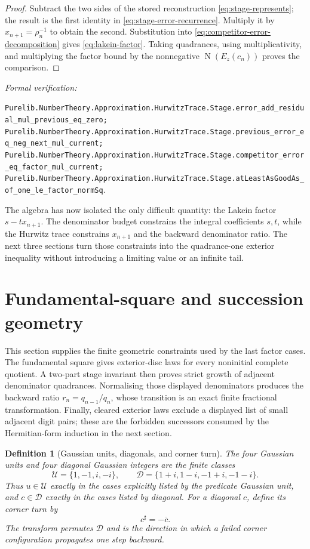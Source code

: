 \documentclass[11pt]{article}
\newtheorem{definition}[definition]{Definition}
\newcommand{\Norm}[1]{\operatorname{N}\!\left(#1\right)}
\newcommand{\leanref}[1]{\par\smallskip\noindent
  \emph{Formal verification:}\par\nobreak
  {\raggedright\nolinkurl{#1}.\par}}
\begin{document}
\begin{proof}
Subtract the two sides of the stored reconstruction
\eqref{eq:stage-represents}; the result is the first identity in
\eqref{eq:stage-error-recurrence}.  Multiply it by
$x_{n+1}=\rho_n^{-1}$ to obtain the second.  Substitution into
\eqref{eq:competitor-error-decomposition} gives
\eqref{eq:lakein-factor}.  Taking quadrances, using multiplicativity, and
multiplying the factor bound by the nonnegative $\Norm{E_z(c_n)}$ proves the
comparison.
\end{proof}

\leanref{Purelib.NumberTheory.Approximation.HurwitzTrace.Stage.error_add_residual_mul_previous_eq_zero;
Purelib.NumberTheory.Approximation.HurwitzTrace.Stage.previous_error_eq_neg_next_mul_current;
Purelib.NumberTheory.Approximation.HurwitzTrace.Stage.competitor_error_eq_factor_mul_current;
Purelib.NumberTheory.Approximation.HurwitzTrace.Stage.atLeastAsGoodAs_of_one_le_factor_normSq}

The algebra has now isolated the only difficult quantity: the Lakein factor
$s-tx_{n+1}$.  The denominator budget constrains the integral coefficients
$s,t$, while the Hurwitz trace constrains $x_{n+1}$ and the backward
denominator ratio.  The next three sections turn those constraints into the
quadrance-one exterior inequality without introducing a limiting value or an
infinite tail.

\section{Fundamental-square and succession geometry}
\label{sec:succession-geometry}

This section supplies the finite geometric constraints used by the last
factor cases.  The fundamental square gives exterior-disc laws for every
noninitial complete quotient.  A two-part stage invariant then proves strict
growth of adjacent denominator quadrances.  Normalising those displayed
denominators produces the backward ratio $r_n=q_{n-1}/q_n$, whose transition
is an exact finite fractional transformation.  Finally, cleared exterior
laws exclude a displayed list of small adjacent digit pairs; these are the
forbidden successors consumed by the Hermitian-form induction in the next
section.

\begin{definition}[Gaussian units, diagonals, and corner turn]
\label{def:small-gaussian-classes}
The four Gaussian units and four diagonal Gaussian integers are the finite
classes
\[
 \mathcal U=\{1,-1,i,-i\},
 \qquad
 \mathcal D=\{1+i,1-i,-1+i,-1-i\}.
\]
Thus $u\in\mathcal U$ exactly in the cases explicitly listed by the
predicate \emph{Gaussian unit}, and $c\in\mathcal D$ exactly in the cases
listed by \emph{diagonal}.  For a diagonal $c$, define its corner turn by
\[
                              c^\sharp=-\overline c.
\]
The transform permutes $\mathcal D$ and is the direction in which a failed
corner configuration propagates one step backward.
\end{definition}
\end{document}
